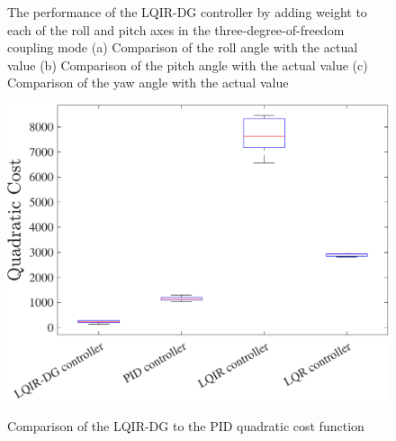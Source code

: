 \documentclass[3p,times]{elsarticle}
\begin{document}
\begin{figure}[H]
	\centering
	\caption{The performance of the LQIR-DG controller by adding weight to each of the roll and pitch axes in the three-degree-of-freedom coupling mode (a) Comparison of the roll angle with the actual value (b) Comparison of the pitch angle with the actual value (c) Comparison of the yaw angle with the actual value}
	\label{fig:compare}
\end{figure}

\begin{figure}[H]
	\centering
	{\includegraphics[width=.49\linewidth]{../Figure/implementation/box_plot/lqidgvsboxplot}
	}
	\caption{Comparison of the LQIR-DG to the PID quadratic cost function}
	\label{fig:compare_boxplot}
\end{figure}
\end{document}
